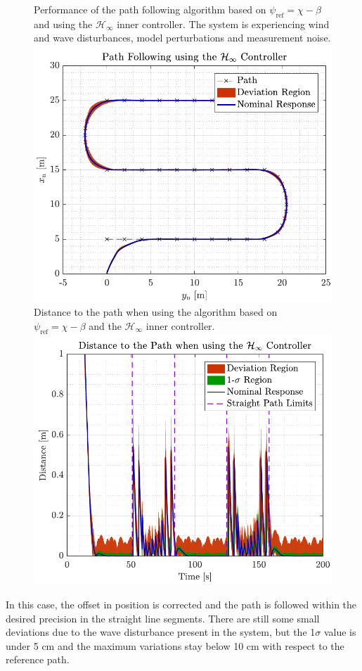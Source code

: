 \begin{figure}[H]
	\captionbox 
	{   
		Performance of the path following algorithm based on $\psi_\mathrm{ref}=\chi-\beta$ and using the $\mathcal{H}_\infty$ inner controller. The system is experiencing wind and wave disturbances, model perturbations and measurement noise. \label{fig:robustcorrect}
	}                                                                 
	{                                                                  
		\includegraphics[width=.45\textwidth]{figures/path_rob}         
	}                                                                    
	\hspace{5pt}                                                          
	\captionbox  
	{      
			Distance to the path when using the algorithm based on $\psi_\mathrm{ref}=\chi-\beta$ and the $\mathcal{H}_\infty$ inner controller. \label{fig:distrobustcorrect}
	}                                                                          
	{
		\includegraphics[width=.45\textwidth]{figures/dist_rob}
	}
\end{figure}

In this case, the offset in position is corrected and the path is followed within the desired precision in the straight line segments. There are still some small deviations due to the wave disturbance present in the system, but the 1$\sigma$ value is under 5 cm and the maximum variations stay below 10 cm with respect to the reference path.

